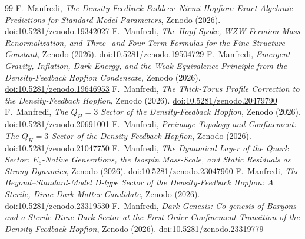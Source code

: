 \documentclass[11pt,a4paper]{article}
\theoremstyle{definition}\newtheorem{definition}[theorem]{Definition}
\begin{document}
\begin{thebibliography}{99}
 F.~Manfredi, \textit{The Density-Feedback Faddeev--Niemi Hopfion:
Exact Algebraic Predictions for Standard-Model Parameters}, Zenodo (2026).
\href{https://doi.org/10.5281/zenodo.19342027}{doi:10.5281/zenodo.19342027}
 F.~Manfredi, \textit{The Hopf Spoke, WZW Fermion Mass Renormalization,
and Three- and Four-Term Formulas for the Fine Structure Constant}, Zenodo (2026).
\href{https://doi.org/10.5281/zenodo.19504729}{doi:10.5281/zenodo.19504729}
 F.~Manfredi, \textit{Emergent Gravity, Inflation, Dark Energy, and the Weak
Equivalence Principle from the Density-Feedback Hopfion Condensate}, Zenodo (2026).
\href{https://doi.org/10.5281/zenodo.19646953}{doi:10.5281/zenodo.19646953}
 F.~Manfredi, \textit{The Thick-Torus Profile Correction to the
Density-Feedback Hopfion}, Zenodo (2026).
\href{https://doi.org/10.5281/zenodo.20479790}{doi:10.5281/zenodo.20479790}
 F.~Manfredi, \textit{The $Q_H=3$ Sector of the Density-Feedback Hopfion},
Zenodo (2026). \href{https://doi.org/10.5281/zenodo.20691001}{doi:10.5281/zenodo.20691001}
 F.~Manfredi, \textit{Preimage Topology and Confinement: The $Q_H=3$ Sector
of the Density-Feedback Hopfion}, Zenodo (2026).
\href{https://doi.org/10.5281/zenodo.21047750}{doi:10.5281/zenodo.21047750}
 F.~Manfredi, \textit{The Dynamical Layer of the Quark Sector: $E_6$-Native
Generations, the Isospin Mass-Scale, and Static Residuals as Strong Dynamics}, Zenodo (2026).
\href{https://doi.org/10.5281/zenodo.23047960}{doi:10.5281/zenodo.23047960}
 F.~Manfredi, \textit{The Beyond--Standard-Model D-type Sector of the
Density-Feedback Hopfion: A Sterile, Dirac Dark-Matter Candidate}, Zenodo (2026).
\href{https://doi.org/10.5281/zenodo.23319530}{doi:10.5281/zenodo.23319530}
 F.~Manfredi, \textit{Dark Genesis: Co-genesis of Baryons and a Sterile Dirac
Dark Sector at the First-Order Confinement Transition of the Density-Feedback Hopfion}, Zenodo
(2026). \href{https://doi.org/10.5281/zenodo.23319779}{doi:10.5281/zenodo.23319779}
\end{thebibliography}
\end{document}
